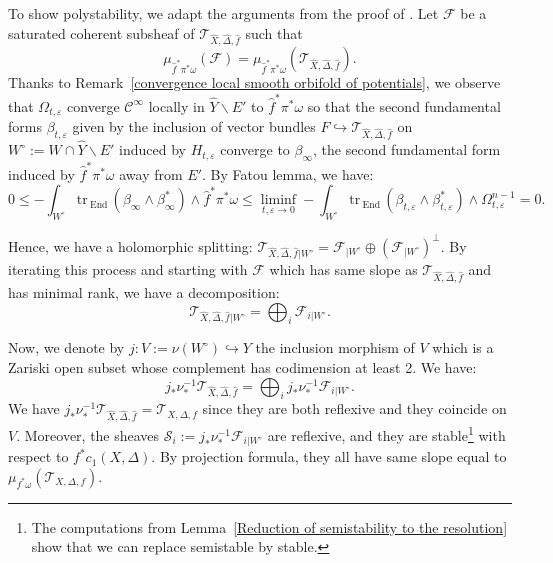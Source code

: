 \documentclass[12pt,a4paper]{amsart}
\newcommand{\End}{\mathrm{End}\,}
\newcommand{\tr}{\mathrm{tr}\,}
\theoremstyle{plain}
\theoremstyle{definition}
\begin{document}
To show polystability, we adapt the arguments from the proof of \cite[Thm.~6]{DGP24}. Let $\mathcal{F}$ be a saturated coherent subsheaf of $\mathcal{T}_{\widehat{X}, \widehat{\Delta}, \widehat{f}}$ such that
$$
\mu_{\widehat{f}^*\pi^* \omega}(\mathcal{F}) = \mu_{\widehat{f}^*\pi^* \omega}(\mathcal{T}_{\widehat{X}, \widehat{\Delta}, \widehat{f}}).
$$
Thanks to Remark~\ref{convergence local smooth orbifold of potentials}, we observe that $\Omega_{t, \varepsilon}$ converge $\mathcal{C}^\infty$ locally in $\widehat{Y} \backslash E'$ to $\widehat{f}^*\pi^*\omega$ so that the second fundamental forms $\beta_{t, \varepsilon}$ given by the inclusion of vector bundles $F \hookrightarrow \mathcal{T}_{\widehat{X}, \widehat{\Delta}, \widehat{f}}$ on $W^\circ := W \cap \widehat{Y} \backslash E'$ induced by $H_{t, \varepsilon}$ converge to $\beta_\infty$, the second fundamental form induced by $\widehat{f}^*\pi^* \omega$ away from $E'$. By Fatou lemma, we have:
$$
0 \leq -\int_{W^\circ} \tr_\End(\beta_\infty \wedge \beta_\infty^*) \wedge \widehat{f}^*\pi^*\omega \leq \liminf_{t, \varepsilon \to 0} -\int_{W^\circ} \tr_\End(\beta_{t, \varepsilon} \wedge \beta_{t, \varepsilon}^*) \wedge \Omega_{t, \varepsilon}^{n-1} = 0.
$$

Hence, we have a holomorphic splitting: $\mathcal{T}_{\widehat{X}, \widehat{\Delta}, \widehat{f} |W^\circ} = \mathcal{F}_{| W^\circ} \oplus (\mathcal{F}_{|W^\circ})^\perp$.
By iterating this process and starting with $\mathcal{F}$ which has same slope as $\mathcal{T}_{\widehat{X}, \widehat{\Delta}, \widehat{f}}$ and has minimal rank, we have a decomposition:
$$
\mathcal{T}_{\widehat{X}, \widehat{\Delta}, \widehat{f} |W^\circ} = \bigoplus_i \mathcal{F}_{i |W^\circ}.
$$


Now, we denote by $j : V := \nu(W^\circ) \hookrightarrow Y$ the inclusion morphism of $V$ which is a Zariski open subset whose complement has codimension at least 2. We have:
$$
j_* \nu^{-1}_* \mathcal{T}_{\widehat{X}, \widehat{\Delta}, \widehat{f}} = \bigoplus_i j_* \nu^{-1}_*\mathcal{F}_{i |W^\circ}.
$$
We have $j_* \nu^{-1}_* \mathcal{T}_{\widehat{X}, \widehat{\Delta}, \widehat{f}} = \mathcal{T}_{X, \Delta, f}$ since they are both reflexive and they coincide on $V$. Moreover, the sheaves $\mathcal{S}_i := j_* \nu^{-1}_*\mathcal{F}_{i |W^\circ}$ are reflexive, and they are stable\footnote{The computations from Lemma~\ref{Reduction of semistability to the resolution} show that we can replace semistable by stable.} with respect to $f^*c_1(X, \Delta)$. By projection formula, they all have same slope equal to $\mu_{f^*\omega}(\mathcal{T}_{X, \Delta, f})$.\\
\end{document}

